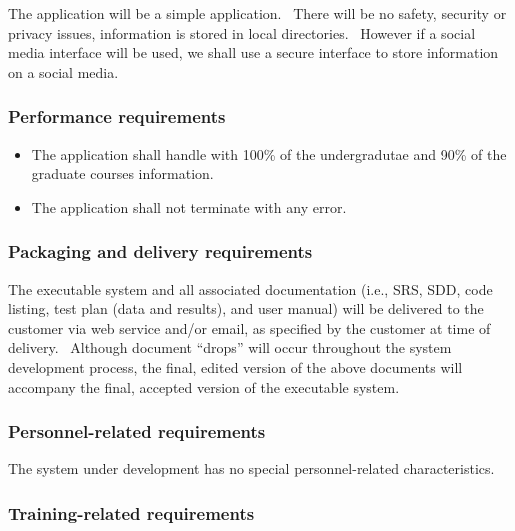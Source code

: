\documentclass[twoside,letterpaper]{article}
\begin{document}
{\color{black}
The application will be a simple application. \ There will be no safety, security or privacy issues, information is stored in local directories. \ However if a social media interface will be used, we shall use a secure interface to store information on a social media. }

\subsubsection[Performance
requirements]{\rmfamily\bfseries\color{black}
Performance requirements}

\noindent\begin{itemize}
  \item The application shall handle with 100\% of the undergradutae and 90\% of the graduate courses information.
  \item The application shall not terminate with any error.
\end{itemize}

\subsubsection[Packaging and delivery
requirements]{\rmfamily\bfseries\color{black}
Packaging and delivery requirements}

{\color{black}
The executable system and all associated documentation (i.e., SRS, SDD,
code listing, test plan (data and results), and user manual) will be
delivered to the customer via web service and/or email, as
specified by the customer at time of delivery. \ Although document
{\textquotedblleft}drops{\textquotedblright} will occur throughout the
system development process, the final, edited version of the above
documents will accompany the final, accepted version of the executable
system.}

\subsubsection[Personnel{}-related
requirements]{\rmfamily\bfseries\color{black}
Personnel-related requirements}

{\color{black}
The system under development has no special personnel-related
characteristics. }

\subsubsection[Training{}-related
requirements]{\rmfamily\bfseries\color{black}
Training-related requirements}
\end{document}
